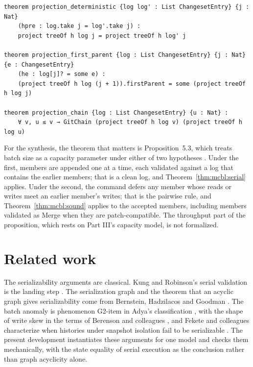 \documentclass[11pt,letterpaper]{article}
\theoremstyle{definition}
\theoremstyle{remark}
\begin{document}
\begin{lstlisting}[language=Lean,caption={The Git projection (\texttt{YonedaTx/Graph.lean})},label={lst:mcbl:projection}]
theorem projection_deterministic {log log' : List ChangesetEntry} {j : Nat}
    (hpre : log.take j = log'.take j) :
    project treeOf h log j = project treeOf h log' j

theorem projection_first_parent {log : List ChangesetEntry} {j : Nat} {e : ChangesetEntry}
    (he : log[j]? = some e) :
    (project treeOf h log (j + 1)).firstParent = some (project treeOf h log j)

theorem projection_chain {log : List ChangesetEntry} {u : Nat} :
    ∀ v, u ≤ v → GitChain (project treeOf h log v) (project treeOf h log u)
\end{lstlisting}

For the synthesis, the theorem that matters is Proposition~5.3, which treats batch size as a capacity parameter under either of two hypotheses \cite{long2026synthesis}. Under the first, members are appended one at a time, each validated against a log that contains the earlier members; that is a clean log, and Theorem~\ref{thm:mcbl:serial} applies. Under the second, the command defers any member whose reads or writes meet an earlier member's writes; that is the pairwise rule, and Theorem~\ref{thm:mcbl:sound} applies to the accepted members, including members validated as Merge when they are patch-compatible. The throughput part of the proposition, which rests on Part III's capacity model, is not formalized.

\section{Related work}
\label{sec:mcbl:related}

The serializability arguments are classical. Kung and Robinson's serial validation is the landing step \cite{kung1981occ}. The serialization graph and the theorem that an acyclic graph gives serializability come from Bernstein, Hadzilacos and Goodman \cite{bhg1987}. The batch anomaly is phenomenon G2-item in Adya's classification \cite{adya1999thesis}, with the shape of write skew in the terms of Berenson and colleagues \cite{berenson1995critique}, and Fekete and colleagues characterize when histories under snapshot isolation fail to be serializable \cite{fekete2005serializable}. The present development instantiates these arguments for one model and checks them mechanically, with the state equality of serial execution as the conclusion rather than graph acyclicity alone.
\end{document}
